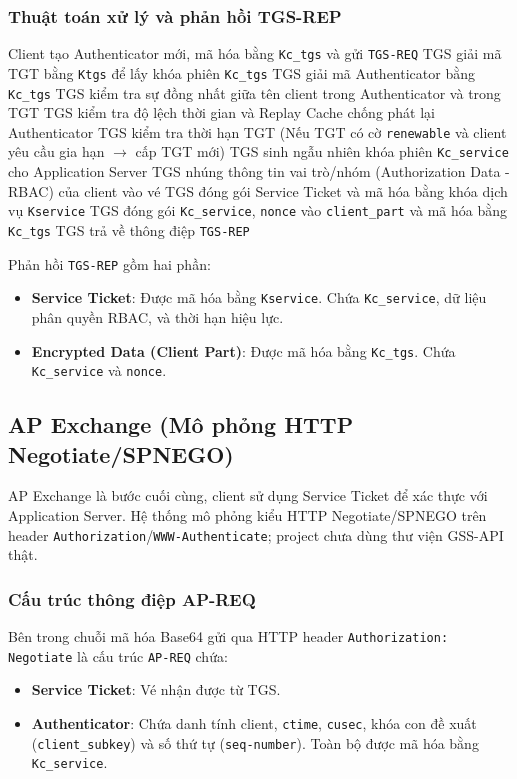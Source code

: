 \documentclass[12pt]{article}
\begin{document}
\subsubsection{Thuật toán xử lý và phản hồi TGS-REP}
\begin{algorithm}[H]
\caption{Xử lý TGS Exchange}
\begin{algorithmic}[1]
\State Client tạo Authenticator mới, mã hóa bằng \texttt{Kc\_tgs} và gửi \texttt{TGS-REQ}
\State TGS giải mã TGT bằng \texttt{Ktgs} để lấy khóa phiên \texttt{Kc\_tgs}
\State TGS giải mã Authenticator bằng \texttt{Kc\_tgs}
\State TGS kiểm tra sự đồng nhất giữa tên client trong Authenticator và trong TGT
\State TGS kiểm tra độ lệch thời gian và Replay Cache chống phát lại Authenticator
\State TGS kiểm tra thời hạn TGT (Nếu TGT có cờ \texttt{renewable} và client yêu cầu gia hạn $\rightarrow$ cấp TGT mới)
\State TGS sinh ngẫu nhiên khóa phiên \texttt{Kc\_service} cho Application Server
\State TGS nhúng thông tin vai trò/nhóm (Authorization Data - RBAC) của client vào vé
\State TGS đóng gói Service Ticket và mã hóa bằng khóa dịch vụ \texttt{Kservice}
\State TGS đóng gói \texttt{Kc\_service}, \texttt{nonce} vào \texttt{client\_part} và mã hóa bằng \texttt{Kc\_tgs}
\State TGS trả về thông điệp \texttt{TGS-REP}
\end{algorithmic}
\end{algorithm}

Phản hồi \texttt{TGS-REP} gồm hai phần:
\begin{itemize}
    \item \textbf{Service Ticket}: Được mã hóa bằng \texttt{Kservice}. Chứa \texttt{Kc\_service}, dữ liệu phân quyền RBAC, và thời hạn hiệu lực.
    \item \textbf{Encrypted Data (Client Part)}: Được mã hóa bằng \texttt{Kc\_tgs}. Chứa \texttt{Kc\_service} và \texttt{nonce}.
\end{itemize}

\subsection{AP Exchange (Mô phỏng HTTP Negotiate/SPNEGO)}

AP Exchange là bước cuối cùng, client sử dụng Service Ticket để xác thực với Application Server. Hệ thống mô phỏng kiểu HTTP Negotiate/SPNEGO trên header \texttt{Authorization}/\texttt{WWW-Authenticate}; project chưa dùng thư viện GSS-API thật.

\subsubsection{Cấu trúc thông điệp AP-REQ}
Bên trong chuỗi mã hóa Base64 gửi qua HTTP header \texttt{Authorization: Negotiate} là cấu trúc \texttt{AP-REQ} chứa:
\begin{itemize}
    \item \textbf{Service Ticket}: Vé nhận được từ TGS.
    \item \textbf{Authenticator}: Chứa danh tính client, \texttt{ctime}, \texttt{cusec}, khóa con đề xuất (\texttt{client\_subkey}) và số thứ tự (\texttt{seq-number}). Toàn bộ được mã hóa bằng \texttt{Kc\_service}.
\end{itemize}
\end{document}
